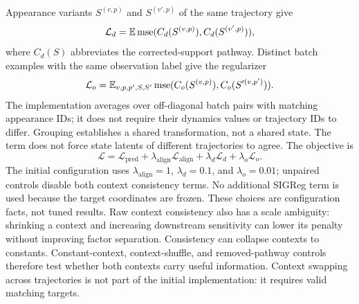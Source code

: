 Appearance variants $S^{(v,p)}$ and $S^{(v',p)}$ of the same trajectory give
\begin{equation}
 \mathcal L_d=\mathbb{E}\operatorname{mse}(C_d(S^{(v,p)}),C_d(S^{(v',p)})),
 \label{eq:dyncons}
\end{equation}
where $C_d(S)$ abbreviates the corrected-support pathway. Distinct batch
examples with the same observation label give the regularizer
\begin{equation}
 \mathcal L_o=\mathbb{E}_{v,p,p',S,S'}
 \operatorname{mse}(C_o(S^{(v,p)}),C_o(S'^{(v,p')})).
 \label{eq:obscons}
\end{equation}
The implementation averages over off-diagonal batch pairs with matching
appearance IDs; it does not require their dynamics values or trajectory IDs
to differ. Grouping establishes a shared transformation, not a shared state.
The term does not force state latents of different trajectories to agree. The objective is
\begin{equation}
 \mathcal L=\mathcal L_{\mathrm{pred}}
 +\lambda_{\mathrm{align}}\mathcal L_{\mathrm{align}}
 +\lambda_d\mathcal L_d+\lambda_o\mathcal L_o.
 \label{eq:loss-complete}
\end{equation}
The initial configuration uses $\lambda_{\mathrm{align}}=1$,
$\lambda_d=0.1$, and $\lambda_o=0.01$; unpaired controls disable both context
consistency terms. No additional SIGReg term is used because the target
coordinates are frozen. These choices are configuration facts, not tuned results.
Raw context consistency also has a scale ambiguity: shrinking a context
and increasing downstream sensitivity can lower its penalty without
improving factor separation. Consistency can collapse contexts to constants. Constant-context,
context-shuffle, and removed-pathway controls therefore test whether both
contexts carry useful information. Context swapping across trajectories
is not part of the initial implementation: it requires valid matching targets.

